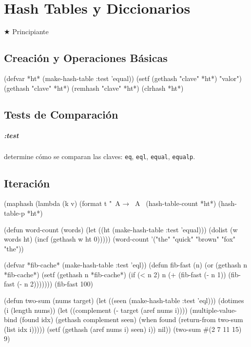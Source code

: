\chapter{Hash Tables y Diccionarios}
\label{chap:hashtables}
{\huge$\bigstar$} Principiante

\section{Creación y Operaciones Básicas}
\begin{lispcode}
(defvar *ht* (make-hash-table :test 'equal))
(setf (gethash "clave" *ht*) "valor")
(gethash "clave" *ht*)
(remhash "clave" *ht*)
(clrhash *ht*)
\end{lispcode}

\section{Tests de Comparación}
\paragraph{:test} determine cómo se comparan las claves: \texttt{eq},
\texttt{eql}, \texttt{equal}, \texttt{equalp}.

\section{Iteración}
\begin{lispcode}
(maphash (lambda (k v) (format t "~A → ~A~%
(hash-table-count *ht*)
(hash-table-p *ht*)
\end{lispcode}

\begin{examplebox}[title=Contador de palabras]
\begin{lispcode}
(defun word-count (words)
  (let ((ht (make-hash-table :test 'equal)))
    (dolist (w words ht)
      (incf (gethash w ht 0)))))
(word-count '("the" "quick" "brown" "fox" "the"))
\end{lispcode}
\end{examplebox}

\begin{examplebox}[title=Memoización de Fibonacci]
\begin{lispcode}
(defvar *fib-cache* (make-hash-table :test 'eql))
(defun fib-fast (n)
  (or (gethash n *fib-cache*)
      (setf (gethash n *fib-cache*)
            (if (< n 2) n (+ (fib-fast (- n 1)) (fib-fast (- n 2)))))))
(fib-fast 100)
\end{lispcode}
\end{examplebox}

\begin{examplebox}[title=Two-sum con hash table]
\begin{lispcode}
(defun two-sum (nums target)
  (let ((seen (make-hash-table :test 'eql)))
    (dotimes (i (length nums))
      (let ((complement (- target (aref nums i))))
        (multiple-value-bind (found idx) (gethash complement seen)
          (when found (return-from two-sum (list idx i)))))
      (setf (gethash (aref nums i) seen) i))
    nil))
(two-sum #(2 7 11 15) 9)
\end{lispcode}
\end{examplebox}

